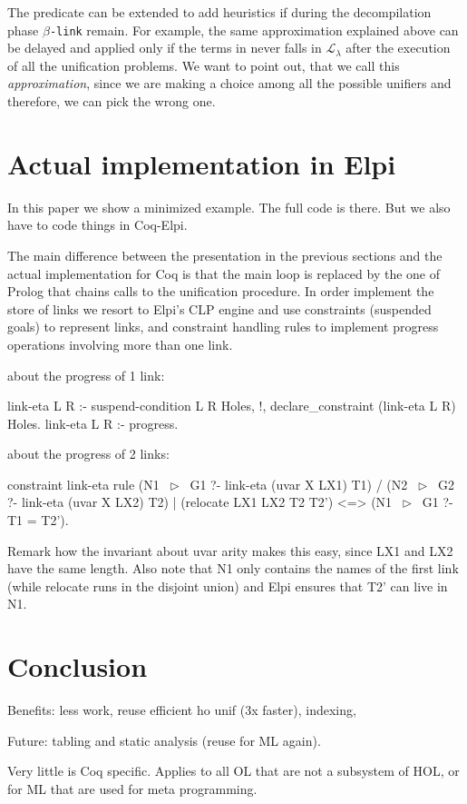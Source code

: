 \documentclass[sigconf,natbib=false,review]{acmart}
\newcommand{\llambda}{\ensuremath{\mathcal{L}_\lambda}\xspace}
\newcommand{\linkMacro}[1]{\ensuremath{#1}\texttt{-link}\xspace}
\newcommand{\linkbeta}{\linkMacro{\beta}}
\begin{document}
The  predicate can be extended to add heuristics if during
the decompilation phase \linkbeta remain. For example, the same approximation
explained above can be delayed and applied only if the terms in \maybebeta never
falls in \llambda after the execution of all the unification problems. We want
to point out, that we call this \emph{approximation}, since we are
making a choice among all the possible unifiers and therefore, we can pick
the wrong one.


\section{Actual implementation in Elpi}\label{sec:implementation}

In this paper we show a minimized example. The full code is there.
But we also have to code things in Coq-Elpi.

The main difference between the presentation in the previous sections and
the actual implementation for Coq is that the main loop \hrun is replaced by
the one of Prolog that chains calls to the unification procedure. In order
implement the store of links we resort to Elpi's CLP engine and
use constraints (suspended goals) to represent links, and constraint
handling rules to implement progress operations involving more than one link.

about the progress of 1 link:

\begin{elpicode}
link-eta L R :- suspend-condition L R Holes, !,
  declare_constraint (link-eta L R) Holes.
link-eta L R :-
  progress. %
\end{elpicode}

about the progress of 2 links:

\begin{elpicode}
constraint link-eta {
  rule (N1 ~$\triangleright$~ G1 ?- link-eta (uvar X LX1) T1) %
    /  (N2 ~$\triangleright$~ G2 ?- link-eta (uvar X LX2) T2) %
    |  (relocate LX1 LX2 T2 T2')             %
   <=> (N1 ~$\triangleright$~ G1 ?- T1 = T2').                %
}
\end{elpicode}

Remark how the invariant about uvar arity makes this easy, since LX1 and LX2
have the same length. Also note that N1 only contains the names of the first
link (while relocate runs in the disjoint union) and Elpi ensures that
T2' can live in N1.

\section{Conclusion}

Benefits: less work, reuse efficient ho unif (3x faster), indexing,

Future: tabling and static analysis (reuse for ML again).

Very little is Coq specific. Applies to all OL that are not a subsystem of 
HOL, or for ML that are used for meta programming.

\printbibliography

\clearpage


\end{document}
